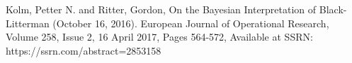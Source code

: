\documentclass[11pt]{article}
\theoremstyle{plain} %
\theoremstyle{remark}
\begin{document}
\newpage 
\begin{thebibliography}{1}

  Kolm, Petter N. and Ritter, Gordon, On the Bayesian Interpretation of
  Black-Litterman (October 16, 2016). European Journal of Operational Research,
  Volume 258, Issue 2, 16 April 2017, Pages 564-572, Available at SSRN:
  https://ssrn.com/abstract=2853158

\end{thebibliography}
\end{document}
